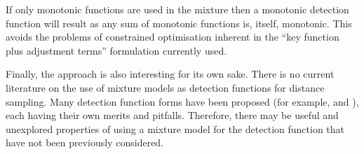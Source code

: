 If only monotonic functions are used in the mixture then a monotonic detection function will result as any sum of monotonic functions is, itself, monotonic. This avoids the problems of constrained optimisation inherent in the ``key function plus adjustment terms'' formulation currently used.

Finally, the approach is also interesting for its own sake. There is no current literature on the use of mixture models as detection functions for distance sampling. Many detection function forms have been proposed (for example, \cite{buckland92} and  \cite{gammadetfct}), each having their own merits and pitfalls. Therefore, there may be useful and unexplored properties of using a mixture model for the detection function that have not been previously considered.





